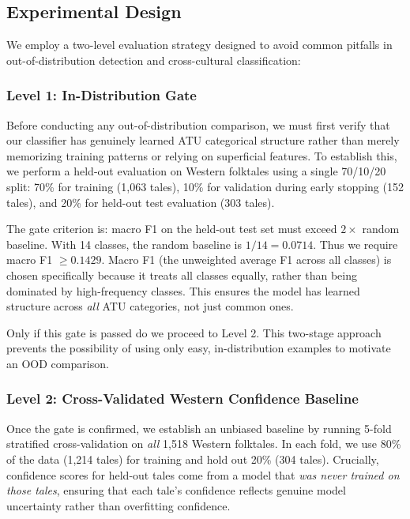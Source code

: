 \documentclass{article}
\begin{document}
\subsection{Experimental Design}

We employ a two-level evaluation strategy designed to avoid common pitfalls in out-of-distribution detection and cross-cultural classification:

\subsubsection{Level 1: In-Distribution Gate}

Before conducting any out-of-distribution comparison, we must first verify that our classifier has genuinely learned ATU categorical structure rather than merely memorizing training patterns or relying on superficial features. To establish this, we perform a held-out evaluation on Western folktales using a single 70/10/20 split: 70\% for training (1,063 tales), 10\% for validation during early stopping (152 tales), and 20\% for held-out test evaluation (303 tales).

The gate criterion is: macro F1 on the held-out test set must exceed $2 \times$ random baseline. With 14 classes, the random baseline is $1/14 = 0.0714$. Thus we require macro F1 $\geq 0.1429$. Macro F1 (the unweighted average F1 across all classes) is chosen specifically because it treats all classes equally, rather than being dominated by high-frequency classes. This ensures the model has learned structure across \textit{all} ATU categories, not just common ones.

Only if this gate is passed do we proceed to Level 2. This two-stage approach prevents the possibility of using only easy, in-distribution examples to motivate an OOD comparison.

\subsubsection{Level 2: Cross-Validated Western Confidence Baseline}

Once the gate is confirmed, we establish an unbiased baseline by running 5-fold stratified cross-validation on \textit{all} 1,518 Western folktales. In each fold, we use 80\% of the data (1,214 tales) for training and hold out 20\% (304 tales). Crucially, confidence scores for held-out tales come from a model that \textit{was never trained on those tales}, ensuring that each tale's confidence reflects genuine model uncertainty rather than overfitting confidence.
\end{document}
